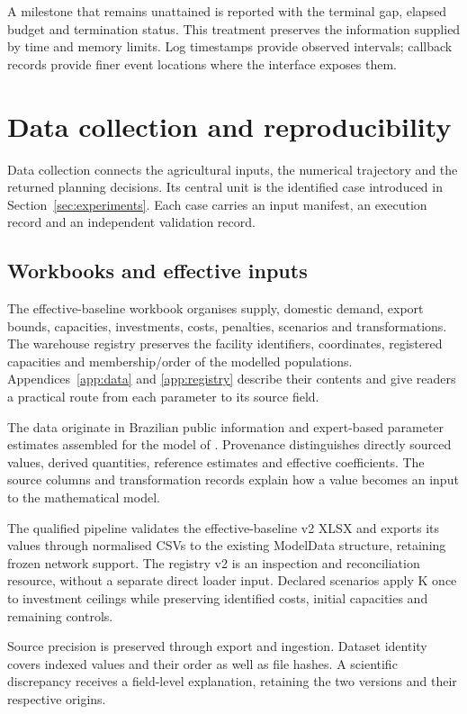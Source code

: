 \documentclass[11pt,a4paper]{article}
\begin{document}
A milestone that remains unattained is reported with the terminal gap, elapsed budget and termination status. This treatment preserves the information supplied by time and memory limits. Log timestamps provide observed intervals; callback records provide finer event locations where the interface exposes them.

\section{Data collection and reproducibility}
\label{sec:collection}

Data collection connects the agricultural inputs, the numerical trajectory and the returned planning decisions. Its central unit is the identified case introduced in Section~\ref{sec:experiments}. Each case carries an input manifest, an execution record and an independent validation record.

\subsection{Workbooks and effective inputs}

The effective-baseline workbook organises supply, domestic demand, export bounds, capacities, investments, costs, penalties, scenarios and transformations. The warehouse registry preserves the facility identifiers, coordinates, registered capacities and membership/order of the modelled populations. Appendices~\ref{app:data} and \ref{app:registry} describe their contents and give readers a practical route from each parameter to its source field.

The data originate in Brazilian public information and expert-based parameter estimates assembled for the model of \citet{rosa2026thesis}. Provenance distinguishes directly sourced values, derived quantities, reference estimates and effective coefficients. The source columns and transformation records explain how a value becomes an input to the mathematical model.

The qualified pipeline validates the effective-baseline v2 XLSX and exports its values through normalised CSVs to the existing ModelData structure, retaining frozen network support. The registry v2 is an inspection and reconciliation resource, without a separate direct loader input. Declared scenarios apply K once to investment ceilings while preserving identified costs, initial capacities and remaining controls.

Source precision is preserved through export and ingestion. Dataset identity covers indexed values and their order as well as file hashes. A scientific discrepancy receives a field-level explanation, retaining the two versions and their respective origins.
\end{document}
